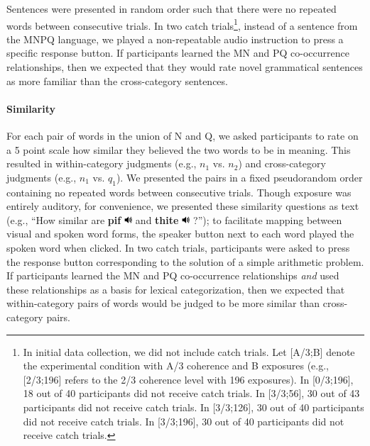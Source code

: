 \documentclass[man,floatsintext]{apa6}
\begin{document}
Sentences were presented in random order such that there were no repeated words between consecutive trials. In two catch trials\footnote{In initial data collection, we did not include catch trials.  Let [A/3;B] denote the experimental condition with A/3 coherence and B exposures (e.g., [2/3;196] refers to the 2/3 coherence level with 196 exposures). In [0/3;196], 18 out of 40 participants did not receive catch trials. In [3/3;56], 30 out of 43 participants did not receive catch trials. In [3/3;126], 30 out of 40 participants did not receive catch trials. In [3/3;196], 30 out of 40 participants did not receive catch trials.}, instead of a sentence from the MNPQ language, we played a non-repeatable audio instruction to press a specific response button.  If participants learned the MN and PQ co-occurrence relationships, then we expected that they would rate novel grammatical sentences as more familiar than the cross-category sentences.

\paragraph{Similarity}
For each pair of words in the union of N and Q, we asked participants to rate on a 5 point scale how similar they believed the two words to be in meaning. This resulted in within-category judgments (e.g., $n_1$ vs. $n_2$) and cross-category judgments (e.g., $n_1$ vs. $q_1$). We presented the pairs in a fixed pseudorandom order containing no repeated words between consecutive trials. Though exposure was entirely auditory, for convenience, we presented these similarity questions as text (e.g., ``How similar are \textbf{pif} \includegraphics[width=0.3cm]{play.png} and \textbf{thite} \includegraphics[width=0.3cm]{play.png} ?''); to facilitate mapping between visual and spoken word forms, the speaker button next to each word played the spoken word when clicked. In two catch trials, participants were asked to press the response button corresponding to the solution of a simple arithmetic problem. If participants learned the MN and PQ co-occurrence relationships \emph{and} used these relationships as a basis for lexical categorization, then we expected that within-category pairs of words would be judged to be more similar than cross-category pairs.
\end{document}
